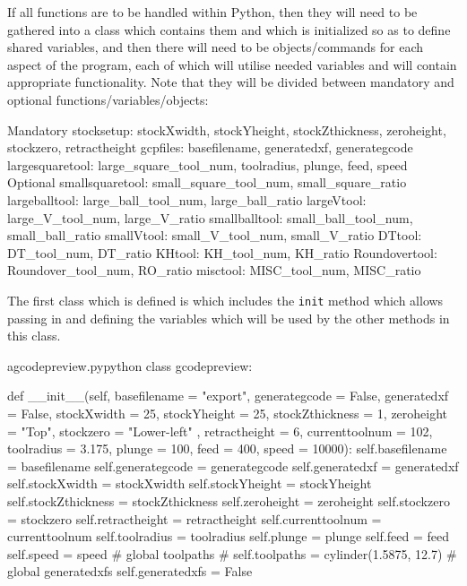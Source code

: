 \documentclass{ltxdoc}
\begin{document}
If all functions are to be handled within Python, then they will need to be gathered into a class which contains them and which is initialized so as to define shared variables, and then there will need to be objects/commands for each aspect of the program, each of which will utilise needed variables and will contain appropriate functionality. Note that they will be divided between mandatory and optional functions/variables/objects:

\begin{outline}
\1 Mandatory
   \2 stocksetup:
      \3 stockXwidth, stockYheight, stockZthickness, zeroheight, stockzero, retract\-height
   \2 gcpfiles: 
      \3 basefilename, generatedxf, generategcode
   \2 largesquaretool: 
      \3 large\_square\_tool\_num, toolradius, plunge, feed, speed
\1 Optional
   \2 smallsquaretool: 
      \3small\_square\_tool\_num, small\_square\_ratio
   \2 largeballtool: 
      \3 large\_ball\_tool\_num, large\_ball\_ratio
   \2 largeVtool: 
      \3 large\_V\_tool\_num, large\_V\_ratio
   \2 smallballtool: 
      \3 small\_ball\_tool\_num, small\_ball\_ratio
   \2 smallVtool: 
      \3 small\_V\_tool\_num, small\_V\_ratio
   \2 DTtool: 
      \3 DT\_tool\_num, DT\_ratio
   \2 KHtool: 
      \3 KH\_tool\_num, KH\_ratio
   \2 Roundovertool: 
      \3 Roundover\_tool\_num, RO\_ratio
   \2 misctool: 
      \3 MISC\_tool\_num, MISC\_ratio
\end{outline}

The first class which is defined is  which includes the \verb|init| method which allows passing in and defining the variables which will be used by the other methods in this class.

\lstset{firstnumber=\thegcpy}
\begin{writecode}{a}{gcodepreview.py}{python}
class gcodepreview:

    def __init__(self, basefilename = "export", 
                 generategcode = False,
                 generatedxf = False,
                 stockXwidth = 25, 
                 stockYheight = 25, 
                 stockZthickness = 1, 
                 zeroheight = "Top", 
                 stockzero = "Lower-left" , 
                 retractheight = 6, 
                 currenttoolnum = 102,
                 toolradius = 3.175,
                 plunge = 100,
                 feed = 400,
                 speed = 10000):
        self.basefilename = basefilename
        self.generategcode = generategcode
        self.generatedxf = generatedxf
        self.stockXwidth = stockXwidth
        self.stockYheight = stockYheight
        self.stockZthickness = stockZthickness
        self.zeroheight = zeroheight
        self.stockzero = stockzero
        self.retractheight = retractheight
        self.currenttoolnum = currenttoolnum
        self.toolradius = toolradius
        self.plunge = plunge
        self.feed = feed
        self.speed = speed
#        global toolpaths
#        self.toolpaths = cylinder(1.5875, 12.7)
#        global generatedxfs
        self.generatedxfs = False
        
\end{writecode}
\addtocounter{gcpy}{35}
\end{document}
